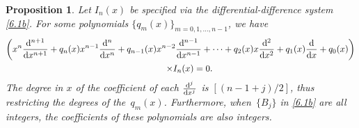 \documentclass[pdftex]{sigma}
\numberwithin{equation}{section}
\newtheorem{Proposition}[Theorem]{Proposition}
\theoremstyle{definition}
\begin{document}
\begin{Proposition}\label{P3.3}
 Let $I_n(x)$ be specified via the differential-difference system
 \eqref{6.1b}. For some polynomials $\{ q_m(x) \}_{m=0,1,\dots,n-1}$, we have
 \begin{gather}
\left ( x^n {{\rm d}^{n+1} \over {\rm d} x^{n+1}} + q_n(x) x^{n-1} {{\rm d}^{n} \over {\rm d} x^{n}} + q_{n-1}(x) x^{n-2}{{\rm d}^{n-1} \over{\rm d} x^{n-1}}+ \cdots +
 q_2(x) x{{\rm d}^2 \over{\rm d} x^2}+
 q_1(x) {{\rm d} \over{\rm d} x} + q_0(x) \right )\nonumber\\
 \qquad\times
 I_n(x) =0.\label{MD3a2}
 \end{gather}
 The degree in $x$ of the coefficient of each
 ${{\rm d}^{j} \over{\rm d} x^{j}}$ is $[(n-1+j)/2]$, thus restricting the degrees of the~$q_m(x)$. Furthermore, when~$\{ B_j \}$
 {in \eqref{6.1b}}
 are all integers, the coefficients of these polynomials are also integers.
 \end{Proposition}
\end{document}
